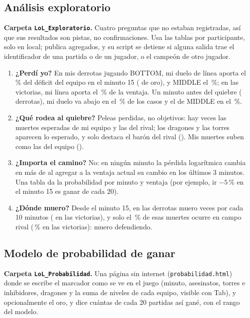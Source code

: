 \documentclass[11pt,letterpaper]{article}
\begin{document}
\subsection{Análisis exploratorio}
\textbf{Carpeta \texttt{LoL\_Exploratorio}.} Cuatro preguntas que no estaban registradas, así
que sus resultados son pistas, no confirmaciones. Usa las tablas por participante, solo en
local; publica agregados, y su script se detiene si alguna salida trae el identificador de
una partida o de un jugador, o el campeón de otro jugador.
\begin{enumerate}[leftmargin=1.6em,itemsep=.2em]
  \item \textbf{¿Perdí yo?} En mis derrotas jugando BOTTOM, mi duelo de línea aporta el
        \eaBotDer\,\% del déficit del equipo en el minuto 15 (\eaDefQuince{} de oro), y
        MIDDLE el \eaMidDer\,\%; en las victorias, mi línea aporta el \eaBotVic\,\% de la
        ventaja. Un minuto antes del quiebre (\eaAbajoN{} derrotas), mi duelo va abajo en
        el \eaAbajoYo\,\% de los casos y el de MIDDLE en el \eaAbajoMid\,\%.
  \item \textbf{¿Qué rodea al quiebre?} Peleas perdidas, no objetivos: hay
        \eaMuerteContra{} veces las muertes esperadas de mi equipo y \eaMuerteFavor{} las del
        rival; los dragones y las torres aparecen lo esperado, y solo destaca el barón del
        rival (\eaBaronContra). Mis muertes suben como las del equipo (\eaMiMuerte).
  \item \textbf{¿Importa el camino?} No: en ningún minuto la pérdida logarítmica cambia en más
        de \eaCaminoMax{} al agregar a la ventaja actual su cambio en los últimos 3 minutos. Una tabla
        da la probabilidad por minuto y ventaja (por ejemplo, ir \(-5\)\,\% en el minuto 15 es
        ganar \eaMenosCincoQuince{} de cada 20).
  \item \textbf{¿Dónde muero?} Desde el minuto 15, en las derrotas muero \eaMuerteDer{} veces
        por cada 10 minutos (\eaMuerteVic{} en las victorias), y solo el \eaCampoDer\,\% de esas
        muertes ocurre en campo rival (\eaCampoVic\,\% en las victorias): muero defendiendo.
\end{enumerate}

\subsection{Modelo de probabilidad de ganar}
\textbf{Carpeta \texttt{LoL\_Probabilidad}.} Una página sin internet
(\texttt{probabilidad.html}) donde se escribe el marcador como se ve en el juego (minuto,
asesinatos, torres e inhibidores, dragones y la suma de niveles de cada equipo, visible con
Tab), y opcionalmente el oro, y dice cuántas de cada 20 partidas así gané, con el rango del
modelo.
\end{document}
